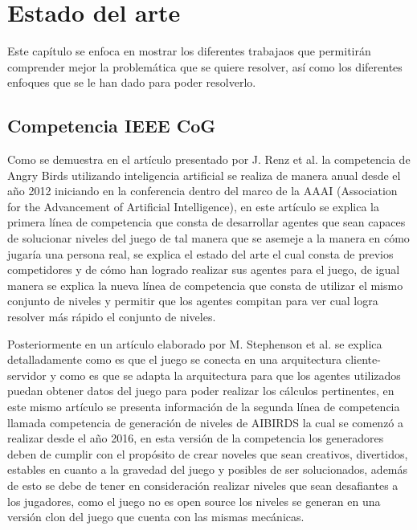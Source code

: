 \chapter{Estado del arte}
\label{chapter:related-work}

Este capítulo se enfoca en mostrar los diferentes trabajaos que permitirán
comprender mejor la problemática que se quiere resolver, así como los diferentes
enfoques que se le han dado para poder resolverlo.

\section{Competencia IEEE CoG}
\label{section:ieeecog}

Como se demuestra en el artículo presentado por J. Renz et al.\cite{Renz2016} la
competencia de Angry Birds utilizando inteligencia artificial se realiza de
manera anual desde el año 2012 iniciando en la conferencia dentro del marco de
la AAAI (Association for the Advancement of Artificial Intelligence), en este
artículo se explica la primera línea de competencia que consta de desarrollar
agentes que sean capaces de solucionar niveles del juego de tal manera que se
asemeje a la manera en cómo jugaría una persona real, se explica el estado del
arte el cual consta de previos competidores y de cómo han logrado realizar sus
agentes para el juego, de igual manera se explica la nueva línea de competencia
que consta de utilizar el mismo conjunto de niveles y permitir que los agentes
compitan para ver cual logra resolver más rápido el conjunto de niveles.

Posteriormente en un artículo elaborado por M. Stephenson et
al.\cite{Stephenson2018The2A} se explica detalladamente como es que el juego se
conecta en una arquitectura cliente-servidor y como es que se adapta la
arquitectura para que los agentes utilizados puedan obtener datos del juego para
poder realizar los cálculos pertinentes, en este mismo artículo se presenta
información de la segunda línea de competencia llamada competencia de generación
de niveles de AIBIRDS la cual se comenzó a realizar desde el año 2016, en esta
versión de la competencia los generadores deben de cumplir con el propósito de
crear noveles que sean creativos, divertidos, estables en cuanto a la gravedad
del juego y posibles de ser solucionados, además de esto se debe de tener en
consideración realizar niveles que sean desafiantes a los jugadores, como el
juego no es open source los niveles se generan en una versión clon del juego que
cuenta con las mismas mecánicas.


